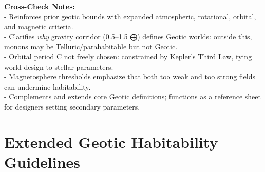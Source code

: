 \documentclass[
  letterpaper,
]{book}
\begin{document}
\textbf{Cross-Check Notes:}\\
- Reinforces prior geotic bounds with expanded atmospheric, rotational,
orbital, and magnetic criteria.\\
- Clarifies \emph{why} gravity corridor (0.5--1.5 ⨁) defines Geotic
worlds: outside this, monons may be Telluric/parahabitable but not
Geotic.\\
- Orbital period C not freely chosen: constrained by Kepler's Third Law,
tying world design to stellar parameters.\\
- Magnetosphere thresholds emphasize that both too weak and too strong
fields can undermine habitability.\\
- Complements and extends core Geotic definitions; functions as a
reference sheet for designers setting secondary parameters.

\chapter{Extended Geotic Habitability
Guidelines}\label{extended-geotic-habitability-guidelines}
\end{document}
